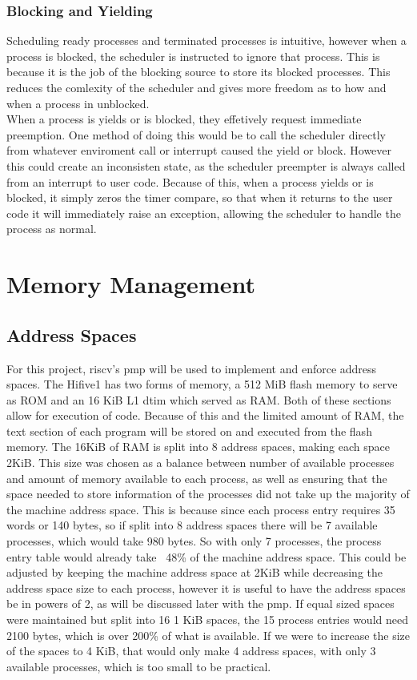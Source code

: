 \subsubsection{Blocking and Yielding}
Scheduling ready processes and terminated processes is intuitive, however when a process is blocked, the scheduler is instructed to ignore that process. This is because it is the job of the blocking source to store its blocked processes. This reduces the comlexity of the scheduler and gives more freedom as to how and when a process in unblocked. \\
When a process is yields or is blocked, they effetively request immediate preemption. One method of doing this would be to call the scheduler directly from whatever enviroment call or interrupt caused the yield or block. However this could create an inconsisten state, as the scheduler preempter is always called from an interrupt to user code. Because of this, when a process yields or is blocked, it simply zeros the timer compare, so that when it returns to the user code it will immediately raise an exception, allowing the scheduler to handle the process as normal.
\section{Memory Management}
\subsection{Address Spaces}
For this project, \gls{riscv}'s \ac{pmp} will be used to implement and enforce address spaces. The Hifive1 has two forms of memory, a 512 MiB flash memory to serve as ROM and an 16 KiB L1 \ac{dtim} which served as RAM. Both of these sections allow for execution of code. Because of this and the limited amount of RAM, the text section of each program will be stored on and executed from the flash memory. The 16KiB of RAM is split into 8 address spaces, making each space 2KiB. This size was chosen as a balance between number of available processes and amount of memory available to each process, as well as ensuring that the space needed to store information of the processes did not take up the majority of the machine address space. This is because since each process entry requires 35 words or 140 bytes, so if split into 8 address spaces there will be 7 available processes, which would take 980 bytes. So with only 7 processes, the process entry table would already take ~48\% of the machine address space. This could be adjusted by keeping the machine address space at 2KiB while decreasing the address space size to each process, however it is useful to have the address spaces be in powers of 2, as will be discussed later with the \ac{pmp}. If equal sized spaces were maintained but split into 16 1 KiB spaces, the 15 process entries would need 2100 bytes, which is over 200\% of what is available. If we were to increase the size of the spaces to 4 KiB, that would only make 4 address spaces, with only 3 available processes, which is too small to be practical.
